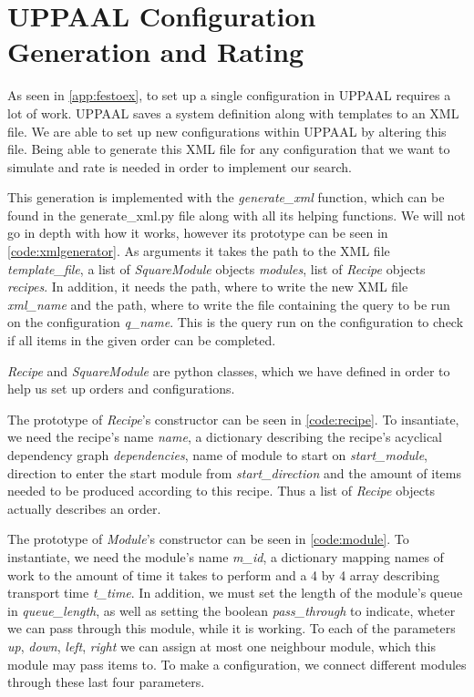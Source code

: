 \section{UPPAAL Configuration Generation and Rating}
As seen in \cref{app:festoex}, to set up a single configuration in UPPAAL requires a lot of work. UPPAAL saves a system definition along with templates to an XML file. We are able to set up new configurations within UPPAAL by altering this file. Being able to generate this XML file for any configuration that we want to simulate and rate is needed in order to implement our search.

This generation is implemented with the \textit{generate\_xml} function, which can be found in the generate\_xml.py file along with all its helping functions. We will not go in depth with how it works, however its prototype can be seen in \cref{code:xmlgenerator}. As arguments it takes the path to the XML file \textit{template\_file}, a list of \textit{SquareModule} objects \textit{modules}, list of \textit{Recipe} objects \textit{recipes}. In addition, it needs the path, where to write the new XML file \textit{xml\_name} and the path, where to write the file containing the query to be run on the configuration \textit{q\_name}. This is the query run on the configuration to check if all items in the given order can be completed. 



\textit{Recipe} and \textit{SquareModule} are python classes, which we have defined in order to help us set up orders and configurations. 

The prototype of \textit{Recipe}'s constructor can be seen in \cref{code:recipe}. To insantiate, we need the recipe's name \textit{name}, a dictionary describing the recipe's acyclical dependency graph \textit{dependencies}, name of module to start on \textit{start\_module}, direction to enter the start module from \textit{start\_direction} and the amount of items needed to be produced according to this recipe. Thus a list of \textit{Recipe} objects actually describes an order.



The prototype of \textit{Module}'s constructor can be seen in \cref{code:module}. To instantiate, we need the module's name \textit{m\_id}, a dictionary mapping names of work to the amount of time it takes to perform and a 4 by 4 array describing transport time \textit{t\_time}. In addition, we must set the length of the module's queue in \textit{queue\_length}, as well as setting the boolean \textit{pass\_through} to indicate, wheter we can pass through this module, while it is working. To each of the parameters \textit{up}, \textit{down}, \textit{left}, \textit{right} we can assign at most one neighbour module, which this module may pass items to. To make a configuration, we connect different modules through these last four parameters.

